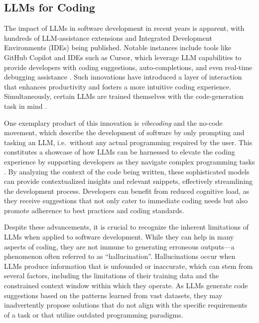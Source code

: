 \documentclass[
  a4paper,
  DIV=11,
  numbers=noendperiod]{scrreprt}
\theoremstyle{definition}
\theoremstyle{remark}
\begin{document}
\subsection{LLMs for Coding}\label{sec-llm-coding}

The impact of LLMs in software development in recent years is apparent,
with hundreds of LLM-assistance extensions and Integrated Development
Environments (IDEs) being published. Notable instances include tools
like GitHub Copilot and IDEs such as Cursor, which leverage LLM
capabilities to provide developers with coding suggestions,
auto-completions, and even real-time debugging assistance
\autocite{cursor,ghcopilot}. Such innovations have introduced a layer of
interaction that enhances productivity and fosters a more intuitive
coding experience. Simultaneously, certain LLMs are trained themselves
with the code-generation task in mind
\autocite{nijkamp2023a,nijkamp2023,openai2025a}.

One exemplary product of this innovation is \emph{vibecoding} and the
no-code movement, which describe the development of software by only
prompting and tasking an LLM, i.e.~without any actual programming
required by the user. This constitutes a showcase of how LLMs can be
harnessed to elevate the coding experience by supporting developers as
they navigate complex programming tasks \autocite{sarkar2025}. By
analyzing the context of the code being written, these sophisticated
models can provide contextualized insights and relevant snippets,
effectively streamlining the development process. Developers can benefit
from reduced cognitive load, as they receive suggestions that not only
cater to immediate coding needs but also promote adherence to best
practices and coding standards.

Despite these advancements, it is crucial to recognize the inherent
limitations of LLMs when applied to software development. While they can
help in many aspects of coding, they are not immune to generating
erroneous outputs---a phenomenon often referred to as ``hallucination''.
Hallucinations occur when LLMs produce information that is unfounded or
inaccurate, which can stem from several factors, including the
limitations of their training data and the constrained context window
within which they operate. As LLMs generate code suggestions based on
the patterns learned from vast datasets, they may inadvertently propose
solutions that do not align with the specific requirements of a task or
that utilize outdated programming paradigms.
\end{document}
